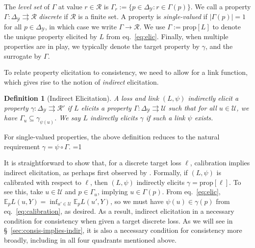 \documentclass{article}
\newcommand{\Comments}{1}
\newcommand{\mytodo}[2]{\ifnum\Comments=1%
	\todo[linecolor=#1!80!black,backgroundcolor=#1,bordercolor=#1!80!black]{#2}\fi}
\newcommand{\raft}[1]{\mytodo{green!20!white}{RF: #1}}
\newcommand{\btw}[1]{\mytodo{gray!10!white}{\textcolor{gray}{BTW: #1}}}%
\newcommand{\simplex}{\Delta_\Y}
\newcommand{\prop}[1]{\mathrm{prop}[#1]}
\newcommand{\E}{\mathbb{E}}
\newcommand{\R}{\mathcal{R}}
\newcommand{\U}{\mathcal{U}}
\newcommand{\Y}{\mathcal{Y}}
\newcommand{\exploss}[3]{\E_{#3} #1(#2,Y)}
\newcommand{\toto}{\rightrightarrows}
\newtheorem{definition}{Definition}
\begin{document}
The \emph{level set} of $\Gamma$ at value $r\in\R$ is $\Gamma_r := \{p \in \simplex : r \in \Gamma(p)\}$.
We call a property $\Gamma: \simplex \toto \R$ \emph{discrete} if $\R$ is a finite set.
A property is \emph{single-valued} if $|\Gamma(p)| = 1$ for all $p\in\simplex$, in which case we write $\Gamma\to\R$.
We use $\Gamma := \prop{L}$ to denote the unique property elicited by $L$ from eq.~\eqref{eq:elic}.
Finally, when multiple properties are in play, we typically denote the target property by $\gamma$, and the surrogate by $\Gamma$.

To relate property elicitation to consistency, we need to allow for a link function, which gives rise to the notion of \emph{indirect} elicitation.
\begin{definition}[Indirect Elicitation]\label{def:indirectly-elicits}
	A loss and link $(L, \psi)$ \emph{indirectly elicit} a property $\gamma:\simplex \toto \R'$ if $L$ elicits a property $\Gamma: \simplex \toto \U$ such that for all $u \in \U$, we have $\Gamma_u \subseteq \gamma_{\psi(u)}$.
	We say $L$ \emph{indirectly elicits} $\gamma$ if such a link $\psi$ exists.
\end{definition}
For single-valued properties, the above definition reduces to the natural requirement $\gamma = \psi \circ \Gamma$.
\btw{interesting discussion of set-valued properties commented out; revive later!}

It is straightforward to show that, for a discrete target loss $\ell$, calibration implies indirect elicitation, as perhaps first observed by \citet{agarwal2015consistent}.
Formally, if $(L,\psi)$ is calibrated with respect to $\ell$, then $(L,\psi)$ indirectly elicits $\gamma = \prop{\ell}$.
To see this, take $u\in\U$ and $p\in\Gamma_u$, implying $u\in\Gamma(p)$.
From eq.~\eqref{eq:elic}, $\exploss{L}{u}{p} = \inf_{u'\in\U} \exploss{L}{u'}{p}$, so we must have $\psi(u) \in \gamma(p)$ from eq.~\eqref{eq:calibration}, as desired.
As a result, indirect elicitation in a necessary condition for consistency when given a target discrete loss.
As we will see in \S~\ref{sec:consis-implies-indir}, it is also a necessary condition for consistency more broadly, including in all four quadrants mentioned above.
\end{document}
